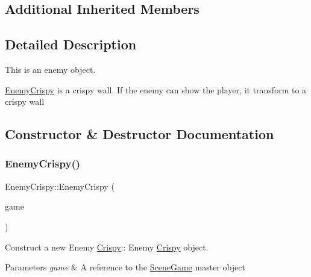 \subsection*{Additional Inherited Members}


\subsection{Detailed Description}
This is an enemy object. 

\hyperlink{class_enemy_crispy}{Enemy\+Crispy} is a crispy wall. If the enemy can show the player, it transform to a crispy wall 

\subsection{Constructor \& Destructor Documentation}
\mbox{\label{class_enemy_crispy_a276b17f05168f7300b6f28472448d422}} 
\subsubsection{\texorpdfstring{Enemy\+Crispy()}{EnemyCrispy()}\hspace{0.1cm}{\footnotesize\ttfamily [1/2]}}
{\footnotesize\ttfamily Enemy\+Crispy\+::\+Enemy\+Crispy (\begin{DoxyParamCaption}\item[{\hyperlink{class_scene_game}{Scene\+Game} \&}]{game }\end{DoxyParamCaption})\hspace{0.3cm}{\ttfamily [explicit]}}



Construct a new Enemy \hyperlink{class_crispy}{Crispy}\+:\+: Enemy \hyperlink{class_crispy}{Crispy} object. 


\begin{DoxyParams}{Parameters}
{\em game} & A reference to the \hyperlink{class_scene_game}{Scene\+Game} master object \\
\hline
\end{DoxyParams}
\mbox{\label{class_enemy_crispy_abd24cf23c15fab4323eceabf2b805898}} 
